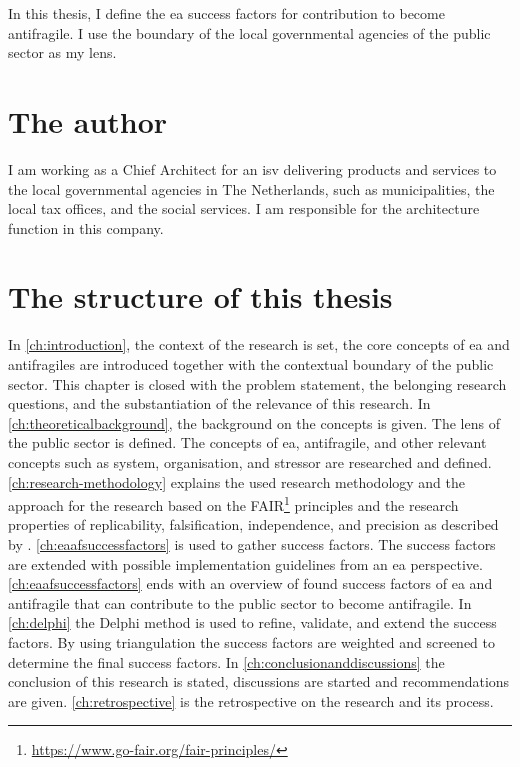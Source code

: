 In this thesis, I define the \acrfull{ea} success factors for contribution to become \gls{antifragile}. I use the boundary of the local governmental agencies of the public sector as my lens.

\section{The author}
\label{sec:context}
I am working as a Chief Architect for an \acrfull{isv} delivering products and services to the local governmental agencies in The Netherlands, such as municipalities, the local tax offices, and the social services. I am responsible for the architecture function in this company.

\section{The structure of this thesis}
\label{sec:structure}
In \cref{ch:introduction}, the context of the research is set, the core concepts of \acrshort{ea} and \glspl{antifragile} are introduced together with the contextual boundary of the public sector. This chapter is closed with the problem statement, the belonging research questions, and the substantiation of the relevance of this research. In \cref{ch:theoreticalbackground}, the background on the concepts is given. The lens of the public sector is defined. The concepts of \acrshort{ea}, \gls{antifragile}, and other relevant concepts such as system, organisation, and stressor are researched and defined. \cref{ch:research-methodology} explains the used research methodology and the approach for the research based on the FAIR\footnote{\url{https://www.go-fair.org/fair-principles/}} principles and the research properties of replicability, falsification, independence, and precision as described by \textcite{Recker2013}. \cref{ch:eaafsuccessfactors} is used to gather success factors. The success factors are extended with possible implementation guidelines from an \acrshort{ea} perspective. \cref{ch:eaafsuccessfactors} ends with an overview of found success factors of \acrshort{ea} and \gls{antifragile} that can contribute to the public sector to become \gls{antifragile}. In \cref{ch:delphi} the Delphi method is used to refine, validate, and extend the success factors. By using triangulation the success factors are weighted and screened to determine the final success factors. In \cref{ch:conclusionanddiscussions} the conclusion of this research is stated, discussions are started and recommendations are given. \cref{ch:retrospective} is the retrospective on the research and its process.

